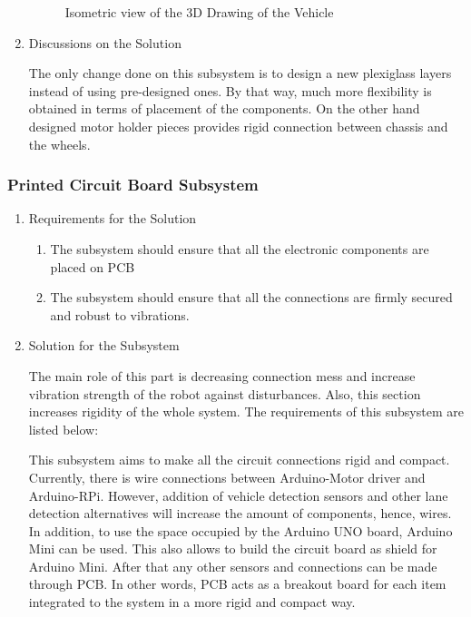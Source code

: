 \documentclass[a4paper,12pt]{article}
\begin{document}
\begin{enumerate}
\begin{figure}[h]
\caption{Isometric view of the 3D Drawing of the Vehicle \label{fig:chassis} }

\end{figure}

\item {Discussions on the Solution}

The only change done on this subsystem is to design a new plexiglass layers instead of using pre-designed ones. By that way, much more flexibility is obtained in terms of placement of the components. On the other hand designed motor holder pieces provides rigid connection between chassis and the wheels.  

\end{enumerate}





\subsubsection{Printed Circuit Board Subsystem}


\begin{enumerate}

\item {Requirements for the Solution}


\begin{enumerate}

\item The subsystem should ensure that all the electronic components are placed on PCB

\item The subsystem should ensure that all the connections are firmly secured and robust to vibrations.

\end{enumerate} 


\item {Solution for the Subsystem}


The main role of this part is decreasing connection mess and increase vibration strength of the robot against disturbances. Also, this section increases rigidity of the whole system. The requirements of this subsystem are listed below:	


This subsystem aims to make all the circuit connections rigid and compact. Currently, there is wire connections between Arduino-Motor driver and Arduino-RPi. However, addition of vehicle detection sensors and other lane detection alternatives will increase the amount of components, hence, wires. In addition, to use the space occupied by the Arduino UNO board, Arduino Mini can be used. This also allows to build the circuit board as shield for Arduino Mini. After that any other sensors and connections can be made through PCB. In other words, PCB acts as a breakout board for each item integrated to the system in a more rigid and compact way.



\end{enumerate}	
\end{document}
